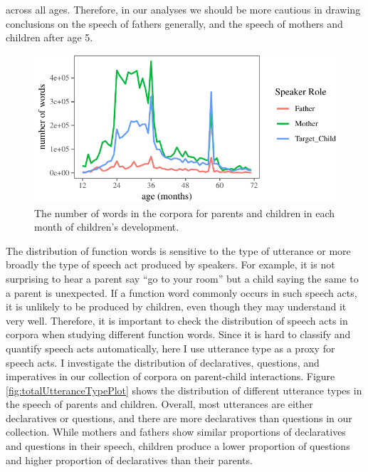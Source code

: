 \documentclass[oneside]{report}
\theoremstyle{definition}
\theoremstyle{definition}
\theoremstyle{definition}
\theoremstyle{remark}
\begin{document}
across all ages. Therefore, in our analyses we should be more cautious
in drawing conclusions on the speech of fathers generally, and the
speech of mothers and children after age 5.
\begin{figure}[tb]

{\centering \includegraphics{figs/wordsByAge-1} 

}

\caption{The number of words in the corpora for parents and children in each month of children's development.}\label{fig:wordsByAge}
\end{figure}
The distribution of function words is sensitive to the type of utterance
or more broadly the type of speech act produced by speakers. For
example, it is not surprising to hear a parent say ``go to your room''
but a child saying the same to a parent is unexpected. If a function
word commonly occurs in such speech acts, it is unlikely to be produced
by children, even though they may understand it very well. Therefore, it
is important to check the distribution of speech acts in corpora when
studying different function words. Since it is hard to classify and
quantify speech acts automatically, here I use utterance type as a proxy
for speech acts. I investigate the distribution of declaratives,
questions, and imperatives in our collection of corpora on parent-child
interactions. Figure \ref{fig:totalUtteranceTypePlot} shows the
distribution of different utterance types in the speech of parents and
children. Overall, most utterances are either declaratives or questions,
and there are more declaratives than questions in our collection. While
mothers and fathers show similar proportions of declaratives and
questions in their speech, children produce a lower proportion of
questions and higher proportion of declaratives than their parents.
\end{document}
